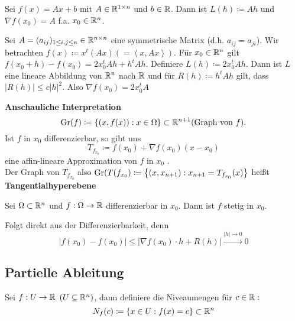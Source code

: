 \begin{example}
	Sei $ f(x) = Ax + b $ mit $ A \in \mathbb{R} ^{1 \times n}  $ und $ b \in \mathbb{R}  $.
	Dann ist $ L(h) \coloneqq Ah $ und $ \nabla f(x_0) = A $ f.a. $ x_0 \in \mathbb{R} ^n $.
\end{example}
\begin{example*}
	Sei $ A = (a_{ij})_{1 \leq i, j \leq n} \in \mathbb{R} ^{n \times n}  $ eine symmetrische Matrix (d.h. $ a_{ij} = a_{ji}  $).
	Wir betrachten $ f(x) \coloneqq x^t (Ax) \left( = \left<x, Ax \right> \right)  $.
	Für $ x_0 \in \mathbb{R} ^n $ gilt $ f(x_0 + h) - f(x_0) = 2x_0^t Ah + h^t Ah $.
	Definiere $ L(h) \coloneqq 2x_0^tAh $.
	Dann ist $ L $ eine lineare Abbildung von $ \mathbb{R} ^n $ nach $ \mathbb{R}  $ und für $ R(h) \coloneqq h^tAh $ gilt, dass $ \left| R(h) \right| \leq c \left| h \right| ^2 $.
	Also $ \nabla f(x_0) = 2x_0^t A $
\end{example*}
\textbf{Anschauliche Interpretation}
\[ \operatorname{Gr}(f) \coloneqq \left\{ (x, f(x)) : x \in \Omega \right\} \subset \mathbb{R} ^{n + 1}  \text{(Graph von $ f $)}. \]
Ist $ f  $ in $ x_0 $ differenzierbar, so gibt uns
\[
	T_{f_{x_0} } \coloneqq f(x_0) + \nabla f(x_0) (x - x_0)
\]
eine affin-lineare Approximation von $ f $ in $ x_0 $ .\\
Der Graph von $ T_{f_{x_0} }  $ 
also $ \operatorname{Gr}(T(f_{x_0} ) \coloneqq \left\{ (x, x_{n + 1} ) : x_{n + 1} = T_{f_{x_0}} (x) \right\}  $ heißt \textbf{Tangentialhyperebene}

\setcounter{environmentnumber}{3}
\begin{theorem}
	Sei $ \Omega \subset \mathbb{R} ^n $ und $ f : \Omega \to \mathbb{R}  $ differenzierbar in $ x_0 $.
	Dann ist $ f  $ stetig in $ x_0 $.
\end{theorem}
\begin{subproof*}
	Folgt direkt aus der Differenzierbarkeit, denn
	\[
		\left| f(x_0) - f(x_0) \right| \leq \left| \nabla f(x_0) \cdot h + R(h) \right| \overset{\left| h \right| \to 0}{\longrightarrow} 0
	\]
\end{subproof*}

\subsection{Partielle Ableitung}
\begin{subdefinition*}[Niveaumenge]
	Sei $ f: U \to \mathbb{R}  $ $ \left( U \subseteq \mathbb{R} ^n \right)  $, dann definiere die Niveaumengen für $ c \in \mathbb{R} : $ 
	\[
		N_f (c) \coloneqq \left\{ x \in U : f(x) = c \right\} \subset \mathbb{R} ^n
	\]
\end{subdefinition*}

